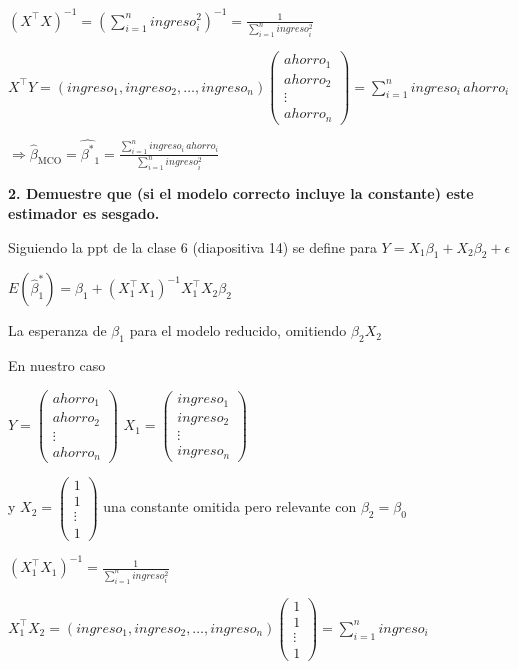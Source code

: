 \documentclass[
  letterpaper,
  DIV=11,
  numbers=noendperiod]{scrartcl}
\begin{document}
\((X^{\top} X) ^{-1} = \left( \sum_{i=1}^n ingreso_i ^2 \right) ^{-1} = \frac{1}{\sum_{i=1}^n ingreso_i^2}\)

\(X^{\top} Y = (ingreso_1, ingreso_2, \ldots, ingreso_n)\begin{pmatrix}ahorro_1 \\ahorro_2 \\\vdots \\ahorro_n\end{pmatrix}= \sum_{i=1}^n ingreso_i \, ahorro_i\)

\(\Rightarrow \hat{\beta}_{\text{MCO}} = \hat{\beta^{*}}_{1} = \frac{\sum_{i=1}^n ingreso_i \, ahorro_i}{\sum_{i=1}^n ingreso_i^2}\)

\textbf{2. Demuestre que (si el modelo correcto incluye la constante)
este estimador es sesgado.}

Siguiendo la ppt de la clase 6 (diapositiva 14) se define para
\(Y = X_1 \beta_1 + X_2 \beta_2 + \epsilon\)

\(E\left(\hat{\beta}_1^{*}\right)= \beta_1 + (X_1^{\top} X_1)^{-1} X_1^{\top} X_2 \beta_2\)

La esperanza de \(\beta_1\) para el modelo reducido, omitiendo
\(\beta_2 X_2\)

En nuestro caso

\(Y=\begin{pmatrix}ahorro_1 \\ahorro_2 \\\vdots \\ahorro_n\end{pmatrix}\)
\(X_1= \begin{pmatrix}ingreso_1 \\ingreso_2 \\\vdots \\ingreso_n\end{pmatrix}\)

y \(X_2 = \begin{pmatrix}1 \\1 \\\vdots \\1\end{pmatrix}\) una constante
omitida pero relevante con \(\beta_2 = \beta_0\)

\((X_1 ^{\top} X_1) ^{-1} = \frac{1}{\sum_{i=1}^n ingreso_i ^2}\)

\(X_1^{\top} X_2=(ingreso_1, ingreso_2, \ldots, ingreso_n)\begin{pmatrix}1 \\1 \\\vdots \\1\end{pmatrix}= \sum_{i=1}^n ingreso_i\)
\end{document}
